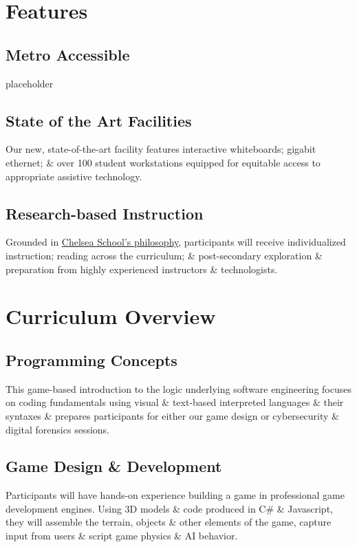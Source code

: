 \documentclass[letterpaper,10pt,english]{sphinxmanual}
\begin{document}
\section{Features}
\label{description:features}

\subsection{Metro Accessible}
\label{description:metro-accessible}
placeholder


\subsection{State of the Art Facilities}
\label{description:state-of-the-art-facilities}
Our new, state-of-the-art facility features interactive whiteboards; gigabit ethernet; \& over 100 student workstations equipped for equitable access to appropriate assistive technology.


\subsection{Research-based Instruction}
\label{description:research-based-instruction}
Grounded in \href{http://chelseaschool.edu/about/}{Chelsea School's philosophy}, participants will receive individualized instruction; reading across the curriculum; \& post-secondary exploration \& preparation from highly experienced instructors \& technologists.


\section{Curriculum Overview}
\label{description:curriculum-overview}

\subsection{Programming Concepts}
\label{description:programming-concepts}
This game-based introduction to the logic underlying software engineering focuses on coding fundamentals using visual \& text-based interpreted languages \& their syntaxes \& prepares participants for either our game design or cybersecurity \& digital forensics sessions.


\subsection{Game Design \& Development}
\label{description:game-design-development}
Participants will have hands-on experience building a game in professional game development engines. Using 3D models \& code produced in C\# \& Javascript, they will assemble the terrain, objects \& other elements of the game, capture input from users \& script game physics \& AI behavior.
\end{document}
